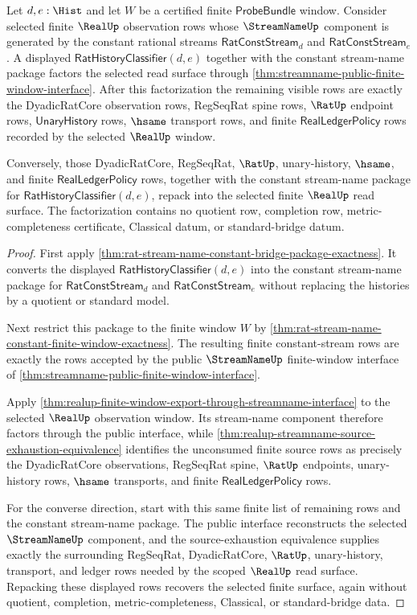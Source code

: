 \begin{theorem}
\label{thm:realup-finite-window-constant-stream-seal-factorization}
Let $d,e:\Hist$ and let $W$ be a certified finite $\mathsf{ProbeBundle}$ window.
Consider selected finite $\RealUp$ observation rows whose $\StreamNameUp$
component is generated by the constant rational streams
$\mathsf{RatConstStream}_d$ and $\mathsf{RatConstStream}_e$. A displayed
$\mathsf{RatHistoryClassifier}(d,e)$ together with the constant stream-name
package factors the selected read surface through
\autoref{thm:streamname-public-finite-window-interface}. After this
factorization the remaining visible rows are exactly the DyadicRatCore
observation rows, RegSeqRat spine rows, $\RatUp$ endpoint rows,
$\mathsf{UnaryHistory}$ rows, $\hsame$ transport rows, and finite
$\mathsf{RealLedgerPolicy}$ rows recorded by the selected $\RealUp$ window.

Conversely, those DyadicRatCore, RegSeqRat, $\RatUp$, unary-history,
$\hsame$, and finite $\mathsf{RealLedgerPolicy}$ rows, together with the
constant stream-name package for
$\mathsf{RatHistoryClassifier}(d,e)$, repack into the selected finite
$\RealUp$ read surface. The factorization contains no quotient row, completion
row, metric-completeness certificate, Classical datum, or standard-bridge
datum.
\end{theorem}
\begin{proof}
First apply
\autoref{thm:rat-stream-name-constant-bridge-package-exactness}. It converts
the displayed $\mathsf{RatHistoryClassifier}(d,e)$ into the constant
stream-name package for $\mathsf{RatConstStream}_d$ and
$\mathsf{RatConstStream}_e$ without replacing the histories by a quotient or
standard model.

Next restrict this package to the finite window $W$ by
\autoref{thm:rat-stream-name-constant-finite-window-exactness}. The resulting
finite constant-stream rows are exactly the rows accepted by the public
$\StreamNameUp$ finite-window interface of
\autoref{thm:streamname-public-finite-window-interface}.

Apply
\autoref{thm:realup-finite-window-export-through-streamname-interface} to the
selected $\RealUp$ observation window. Its stream-name component therefore
factors through the public interface, while
\autoref{thm:realup-streamname-source-exhaustion-equivalence} identifies the
unconsumed finite source rows as precisely the DyadicRatCore observations,
RegSeqRat spine, $\RatUp$ endpoints, unary-history rows, $\hsame$ transports,
and finite $\mathsf{RealLedgerPolicy}$ rows.

For the converse direction, start with this same finite list of remaining
rows and the constant stream-name package. The public interface reconstructs
the selected $\StreamNameUp$ component, and the source-exhaustion equivalence
supplies exactly the surrounding RegSeqRat, DyadicRatCore, $\RatUp$,
unary-history, transport, and ledger rows needed by the scoped $\RealUp$ read
surface. Repacking these displayed rows recovers the selected finite surface,
again without quotient, completion, metric-completeness, Classical, or
standard-bridge data.
\end{proof}

